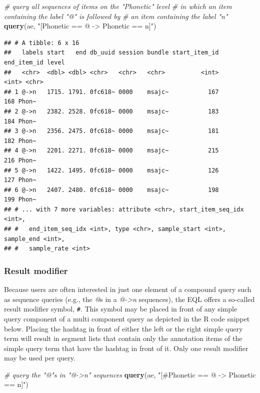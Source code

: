 \documentclass[]{book}
\newenvironment{Shaded}{\begin{snugshade}}{\end{snugshade}}
\newcommand{\CommentTok}[1]{\textcolor[rgb]{0.56,0.35,0.01}{\textit{#1}}}
\newcommand{\KeywordTok}[1]{\textcolor[rgb]{0.13,0.29,0.53}{\textbf{#1}}}
\newcommand{\NormalTok}[1]{#1}
\newcommand{\StringTok}[1]{\textcolor[rgb]{0.31,0.60,0.02}{#1}}
\begin{document}
\begin{Shaded}
\begin{Highlighting}[]
\CommentTok{# query all sequences of items on the "Phonetic" level}
\CommentTok{# in which an item containing the label "@" is followed by}
\CommentTok{# an item containing the label "n"}
\KeywordTok{query}\NormalTok{(ae, }\StringTok{"[Phonetic == @ -> Phonetic == n]"}\NormalTok{)}
\end{Highlighting}
\end{Shaded}

\begin{verbatim}
## # A tibble: 6 x 16
##   labels start   end db_uuid session bundle start_item_id end_item_id level
##   <chr>  <dbl> <dbl> <chr>   <chr>   <chr>          <int>       <int> <chr>
## 1 @->n   1715. 1791. 0fc618~ 0000    msajc~           167         168 Phon~
## 2 @->n   2382. 2528. 0fc618~ 0000    msajc~           183         184 Phon~
## 3 @->n   2356. 2475. 0fc618~ 0000    msajc~           181         182 Phon~
## 4 @->n   2201. 2271. 0fc618~ 0000    msajc~           215         216 Phon~
## 5 @->n   1422. 1495. 0fc618~ 0000    msajc~           126         127 Phon~
## 6 @->n   2407. 2480. 0fc618~ 0000    msajc~           198         199 Phon~
## # ... with 7 more variables: attribute <chr>, start_item_seq_idx <int>,
## #   end_item_seq_idx <int>, type <chr>, sample_start <int>, sample_end <int>,
## #   sample_rate <int>
\end{verbatim}

\hypertarget{result-modifier}{%
\subsubsection{Result modifier}\label{result-modifier}}

Because users are often interested in just one element of a compound query such as sequence queries (e.g., the \emph{@}s in a \emph{@-\textgreater{}n} sequences), the EQL offers a so-called result modifier symbol, \texttt{\#}. This symbol may be placed in front of any simple query component of a multi component query as depicted in the R code snippet below. Placing the hashtag in front of either the left or the right simple query term will result in segment lists that contain only the annotation items of the simple query term that have the hashtag in front of it. Only one result modifier may be used per query.

\begin{Shaded}
\begin{Highlighting}[]
\CommentTok{# query the "@"s in "@->n" sequences}
\KeywordTok{query}\NormalTok{(ae, }\StringTok{"[#Phonetic == @ -> Phonetic == n]"}\NormalTok{)}
\end{Highlighting}
\end{Shaded}
\end{document}
